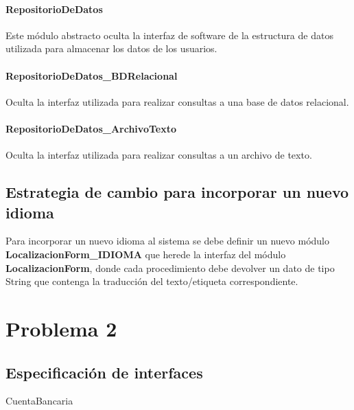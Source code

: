 \documentclass[12pt,a4paper,fleqn]{article}
\begin{document}
\paragraph{RepositorioDeDatos}
Este módulo abstracto oculta la interfaz de software de la estructura de datos
utilizada para almacenar los datos de los usuarios.
\paragraph{RepositorioDeDatos\_BDRelacional}
Oculta la interfaz utilizada para realizar consultas a una base de datos relacional.
\paragraph{RepositorioDeDatos\_ArchivoTexto}
Oculta la interfaz utilizada para realizar consultas a un archivo de texto.

\subsection{Estrategia de cambio para incorporar un nuevo idioma}
Para incorporar un nuevo idioma al sistema se debe definir un nuevo módulo 
\textbf{LocalizacionForm\_IDIOMA} que herede la interfaz del módulo \textbf{LocalizacionForm},
donde cada procedimiento debe devolver un dato de tipo String que contenga
la traducción del texto/etiqueta correspondiente.

\newpage

\section{Problema 2}
\subsection{Especificación de interfaces}

\begin{module}{CuentaBancaria}
\eproc
{}
\end{module}
\end{document}
